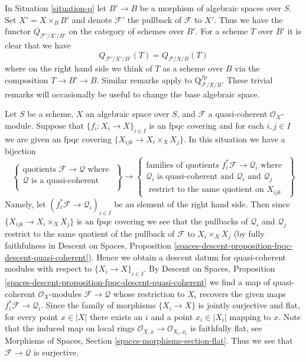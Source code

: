 \begin{remark}
\label{remark-q-base-change}
In Situation \ref{situation-q} let $B' \to B$ be a morphism of
algebraic spaces over $S$. Set $X' = X \times_B B'$ and denote
$\mathcal{F}'$ the pullback of $\mathcal{F}$ to $X'$.
Thus we have the functor $Q_{\mathcal{F}'/X'/B'}$ on
the category of schemes over $B'$. For a scheme $T$ over $B'$
it is clear that we have
$$
Q_{\mathcal{F}'/X'/B'}(T) = Q_{\mathcal{F}/X/B}(T)
$$
where on the right hand side we think of $T$ as a scheme over $B$
via the composition $T \to B' \to B$.
Similar remarks apply to $\text{Q}^{fp}_{\mathcal{F}/X/B}$.
These trivial remarks
will occasionally be useful to change the base algebraic space.
\end{remark}

\begin{remark}
\label{remark-q-sheaf}
Let $S$ be a scheme, $X$ an algebraic space over $S$, and $\mathcal{F}$
a quasi-coherent $\mathcal{O}_X$-module. Suppose that
$\{f_i : X_i \to X\}_{i \in I}$
is an fpqc covering and for each $i, j \in I$ we are given an fpqc covering
$\{X_{ijk} \to X_i \times_X X_j\}$. In this situation we have a bijection
$$
\left\{
\begin{matrix}
\text{quotients }\mathcal{F} \to \mathcal{Q}\text{ where } \\
\mathcal{Q}\text{ is a quasi-coherent }\\
\end{matrix}
\right\}
\longrightarrow
\left\{
\begin{matrix}
\text{families of quotients }f_i^*\mathcal{F} \to \mathcal{Q}_i
\text{ where } \\
\mathcal{Q}_i\text{ is quasi-coherent and }
\mathcal{Q}_i\text{ and }\mathcal{Q}_j\\
\text{ restrict to the same quotient on }X_{ijk}
\end{matrix}
\right\}
$$
Namely, let $(f_i^*\mathcal{F} \to \mathcal{Q}_i)_{i \in I}$
be an element of the right hand side. Then since
$\{X_{ijk} \to X_i \times_X X_j\}$ is an fpqc covering we see that
the pullbacks of $\mathcal{Q}_i$ and $\mathcal{Q}_j$ restrict
to the same quotient of the pullback of $\mathcal{F}$ to $X_i \times_X X_j$
(by fully faithfulness in
Descent on Spaces, Proposition
\ref{spaces-descent-proposition-fpqc-descent-quasi-coherent}).
Hence we obtain a descent datum for quasi-coherent modules
with respect to $\{X_i \to X\}_{i \in I}$. By
Descent on Spaces, Proposition
\ref{spaces-descent-proposition-fpqc-descent-quasi-coherent}
we find a map of quasi-coherent $\mathcal{O}_X$-modules
$\mathcal{F} \to \mathcal{Q}$ whose restriction to $X_i$ recovers
the given maps $f_i^*\mathcal{F} \to \mathcal{Q}_i$.
Since the family of morphisms $\{X_i \to X\}$ is jointly surjective
and flat, for every point $x \in |X|$ there exists an $i$ and a point
$x_i \in |X_i|$ mapping to $x$. Note that the induced map on
local rings
$\mathcal{O}_{X, \overline{x}} \to \mathcal{O}_{X_i, \overline{x_i}}$
is faithfully flat, see
Morphisms of Spaces, Section \ref{spaces-morphisms-section-flat}.
Thus we see that $\mathcal{F} \to \mathcal{Q}$ is surjective.
\end{remark}

